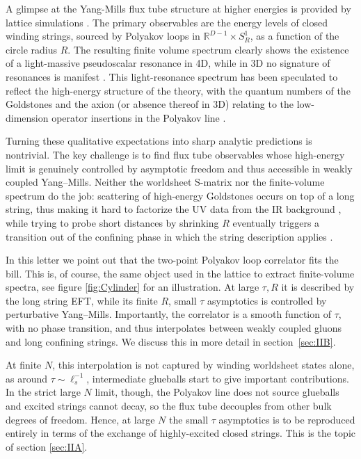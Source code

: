 \documentclass[
 reprint,
 amsmath,
 pre,
 amssymb,
 nofootinbib,
 aps,
 longbibliography,
]{revtex4-1}
\newcommand{\<}{{\langle}}
\renewcommand{\>}{{\rangle}}
\begin{document}
A glimpse at the Yang-Mills flux tube structure at higher energies is provided by lattice simulations \cite{Luscher:2002qv,Athenodorou:2011rx,Caselle:2024zoh, Sharifian:2025fyl}.
The primary observables are the energy levels of closed winding strings, sourced by Polyakov loops in $\mathbb{R}^{D-1} \times S^1_R$, as a function of the circle radius $R$. The resulting finite volume spectrum clearly shows the existence of a light-massive pseudoscalar resonance in 4D, while in 3D no signature of resonances is manifest \cite{Dubovsky:2013gi}. This light-resonance spectrum has been speculated to reflect the high-energy structure of the theory, with the quantum numbers of the Goldstones and the axion (or absence thereof in 3D) relating to the low-dimension operator insertions in the Polyakov line \cite{Dubovsky_2018, Gabai:2025hwf}.

Turning these qualitative expectations into sharp analytic predictions is nontrivial. The key challenge is to find flux tube observables whose high-energy limit is genuinely controlled by asymptotic freedom and thus accessible in weakly coupled Yang–Mills. Neither the worldsheet S-matrix nor the finite-volume spectrum do the job:
scattering of high-energy Goldstones occurs on top of a long string, thus making it hard to factorize the UV data from the IR background \cite{Dubovsky_2018}, while trying to probe short distances by shrinking $R$ eventually triggers a transition out of the confining phase in which the string description applies \cite{Polyakov:1978vu}.

In this letter we point out that the two-point Polyakov loop correlator fits the bill.
This is, of course, the same object used in the lattice to extract finite-volume spectra, see figure \ref{fig:Cylinder} for an illustration.
At large $\tau, R$ it is described by the long string EFT, while its finite $R$, small $\tau$ asymptotics is controlled by perturbative Yang–Mills. Importantly, the correlator is a smooth function of $\tau$, with no phase transition, and thus interpolates between weakly coupled gluons and long confining strings. We discuss this in more detail in section~\ref{sec:IIB}.

At finite $N$, this interpolation is not captured by winding worldsheet states alone, as around $\tau \sim \ell_s^{-1}$, intermediate glueballs start to give important contributions. In the strict large $N$ limit, though, the Polyakov line does not source glueballs and excited strings cannot decay, so the flux tube decouples from other bulk degrees of freedom.
Hence, at large $N$ the small $\tau$ asymptotics is to be reproduced entirely in terms of the exchange of highly-excited closed strings. This is the topic of section \ref{sec:IIA}.
\end{document}
